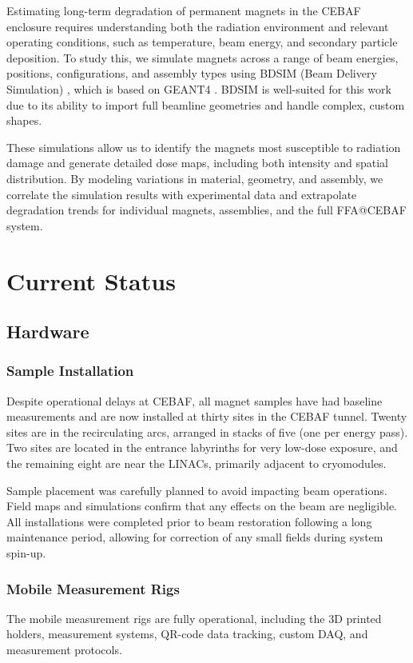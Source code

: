 \documentclass[a4paper,
               ]{jacow}
\begin{document}
Estimating long-term degradation of permanent magnets in the CEBAF enclosure requires understanding both the radiation environment and relevant operating conditions, such as temperature, beam energy, and secondary particle deposition. To study this, we simulate magnets across a range of beam energies, positions, configurations, and assembly types using BDSIM (Beam Delivery Simulation) \cite{NEVAY:BDSIM}, which is based on GEANT4 \cite{GEANT4}. BDSIM is well-suited for this work due to its ability to import full beamline geometries and handle complex, custom shapes.

These simulations allow us to identify the magnets most susceptible to radiation damage and generate detailed dose maps, including both intensity and spatial distribution. By modeling variations in material, geometry, and assembly, we correlate the simulation results with experimental data and extrapolate degradation trends for individual magnets, assemblies, and the full FFA@CEBAF system.


\section{Current Status}

\subsection{Hardware}

\subsubsection{Sample Installation}
Despite operational delays at CEBAF, all magnet samples have had baseline measurements and are now installed at thirty sites in the CEBAF tunnel. Twenty sites are in the recirculating arcs, arranged in stacks of five (one per energy pass). Two sites are located in the entrance labyrinths for very low-dose exposure, and the remaining eight are near the LINACs, primarily adjacent to cryomodules.

Sample placement was carefully planned to avoid impacting beam operations. Field maps and simulations confirm that any effects on the beam are negligible. All installations were completed prior to beam restoration following a long maintenance period, allowing for correction of any small fields during system spin-up.

\subsubsection{Mobile Measurement Rigs}
The mobile measurement rigs are fully operational, including the 3D printed holders, measurement systems, QR-code data tracking, custom DAQ, and measurement protocols.
\end{document}
